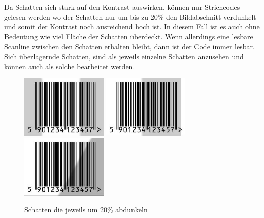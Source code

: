 Da Schatten sich stark auf den Kontrast auswirken, können nur Strichcodes gelesen werden wo der Schatten nur um bis zu 20\% den Bildabschnitt verdunkelt und somit der Kontrast noch ausreichend hoch ist. In diesem Fall ist es auch ohne Bedeutung wie viel Fläche der Schatten überdeckt. Wenn allerdings eine lesbare Scanline zwischen den Schatten erhalten bleibt, dann ist der Code immer lesbar. Sich überlagernde Schatten, sind als jeweils einzelne Schatten anzusehen und können auch als solche bearbeitet werden.
\begin{figure}[H]
  \centering
  \includegraphics[height=3cm]{img/EAN13/shade_01_2x50+50.jpg}
  \includegraphics[height=3cm]{img/EAN13/shade_01_20+50.jpg}
  \includegraphics[height=3cm]{img/EAN13/shade_01_20+s30.jpg}
  \caption{Schatten die jeweils um 20\% abdunkeln}
  \label{fig:eandark}
\end{figure}
